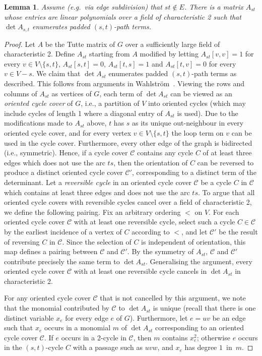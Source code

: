 \documentclass[10pt,a4paper]{article}
\newtheorem{lemma}{Lemma}[section]
\newcommand{\cC}{\ensuremath{\mathcal C}\xspace}
\begin{document}
\begin{lemma} \label{lemma:padded-st-paths}
  Assume (e.g.\ via edge subdivision) that $st \notin E$. 
  There is a matrix $A_{st}$ whose entries are linear polynomials
  over a field of characteristic 2 such
  that $\det A_{s,t}$ enumerates padded $(s,t)$-path terms.
\end{lemma}
\begin{proof}
  Let $A$ be the Tutte matrix of $G$ over a sufficiently large field
  of characteristic 2. Define $A_{st}$ starting from $A$ modified 
  by letting $A_{st}[v,v]=1$ for every
  $v \in V \setminus \{s,t\}$, $A_{st}[s,t]=0$, $A_{st}[t,s]=1$ and $A_{st}[t,v]=0$
  for every $v \in V-s$. We claim that $\det A_{st}$ enumerates padded
  $(s,t)$-path terms as described. This follows from arguments in
  Wahlstr\"om~\cite{Wahlstrom13STACS}. Viewing the rows and columns of
  $A_{st}$ as vertices of $G$, each term of $\det A_{st}$ can be
  viewed as an \emph{oriented cycle cover} of $G$, i.e., a partition
  of $V$ into oriented cycles (which may include cycles of length 1
  where a diagonal entry of $A_{st}$ is used). Due to the
  modifications made to $A_{st}$ above, $t$ has $s$ as its unique out-neighbour 
  in every oriented cycle cover, and for every vertex $v \in V \setminus \{s,t\}$
  the loop term on $v$ can be used in the cycle cover.
  Furthermore, every other edge of the graph is bidirected
  (i.e., symmetric). Hence, if a cycle cover $\cC$ contains any cycle
  $C$ of at least three edges which does not use the arc $ts$,
  then the orientation of $C$ can be reversed to produce a distinct
  oriented cycle cover $\cC'$, corresponding to a distinct term of the
  determinant. Let a \emph{reversible cycle} in
  an oriented cycle cover $\cC$ be a cycle $C$ in $\cC$ which contains
  at least three edges and does not use the arc $ts$. To argue that
  all oriented cycle covers with reversible cycles cancel over a field
  of characteristic 2, we define the following pairing. Fix an
  arbitrary ordering $<$ on $V$. For each oriented cycle cover $\cC$ with
  at least one reversible cycle, select such a cycle $C \in \cC$
  by the earliest incidence of a vertex of $C$ according to $<$,
  and let $\cC'$ be the result of reversing $C$ in $\cC$. Since
  the selection of $C$ is independent of orientation, this map defines
  a pairing between $\cC$ and $\cC'$. By the symmetry of $A_{st}$,
  $\cC$ and $\cC'$ contribute precisely the same term to $\det A_{st}$.
  Generalising the argument, every oriented cycle cover $\cC$ with at
  least one reversible cycle cancels in $\det A_{st}$ in
  characteristic 2. 

  For any oriented cycle cover $\cC$ that is not cancelled by this
  argument, we note that the monomial contributed by $\cC$ to $\det A_{st}$
  is unique (recall that there is one distinct variable $x_e$ for
  every edge $e$ of $G$). Furthermore, let $e=uv$ be an edge such that
  $x_e$ occurs in a monomial $m$ of $\det A_{st}$ corresponding to an
  oriented cycle cover $\cC$. If $e$ occurs in a 2-cycle in $\cC$,
  then $m$ contains $x_e^2$; otherwise $e$ occurs in the $(s,t)$-cycle $C$
  with a passage such as $uvw$, and $x_e$ has degree $1$~in~$m$. 
\end{proof}
\end{document}
